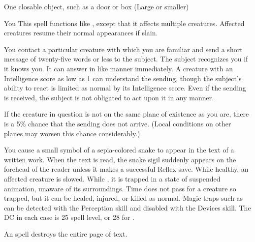 \begin{spelltarget}{One closable object, such as a door or box (Large or smaller)}
\begin{spelltarget}{You}
\spelldur{\durlong \dismissable}
\spelleffect This spell functions like , except that it affects multiple creatures. Affected creatures resume their normal appearances if slain.

\spelleffect You contact a particular creature with which you are familiar and send a short message of twenty-five words or less to the subject. The subject recognizes you if it knows you. It can answer in like manner immediately. A creature with an Intelligence score as low as 1 can understand the sending, though the subject's ability to react is limited as normal by its Intelligence score. Even if the sending is received, the subject is not obligated to act upon it in any manner.
\par If the creature in question is not on the same plane of existence as you are, there is a 5\% chance that the sending does not arrive. (Local conditions on other planes may worsen this chance considerably.)

\spelleffect You cause a small symbol of a sepia-colored snake to appear in the text of a written work. When the text is read, the snake sigil suddenly appears on the forehead of the reader unless it makes a successful Reflex save. While healthy, an affected creature is slowed. While \bloodied, it is trapped in a state of suspended animation, unaware of its surroundings. Time does not pass for a creature so trapped, but it can be healed, injured, or killed as normal.
\spellnotes Magic traps such as  can be detected with the Perception skill and disabled with the Devices skill. The DC in each case is 25 \add spell level, or 28 for .

An  spell destroys the entire page of text.


\end{spelltarget}
\end{spelltarget}
